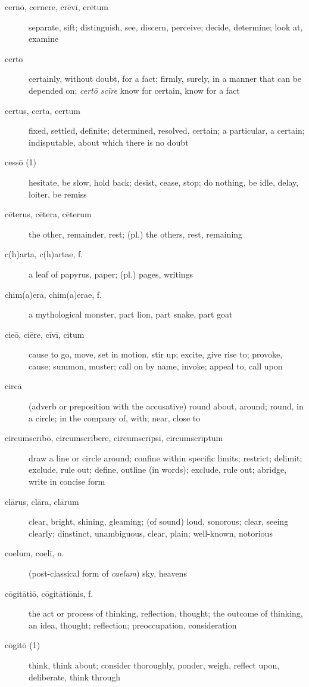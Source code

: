 \begin{description}
    \item[cernō, cernere, crēvī, crētum] \marginnote{*}separate, sift; distinguish, see, discern, perceive; decide, determine; look at, examine
    \item[certō] certainly, without doubt, for a fact; firmly, surely, in a manner that can be depended on; \textit{certō scīre} know for certain, know for a fact
    \item[certus, certa, certum] \marginnote{*}fixed, settled, definite; determined, resolved, certain; a particular, a certain; indisputable, about which there is no doubt
    \item[cessō (1)] hesitate, be slow, hold back; desist, cease, stop; do nothing, be idle, delay, loiter, be remiss
    \item[cēterus, cētera, cēterum] \marginnote{*}the other, remainder, rest; (pl.) the others, rest, remaining
    \item[c(h)arta, c(h)artae, f.]  a leaf of papyrus, paper; (pl.) pages, writings
    \item[chim(a)era, chim(a)erae, f.] a mythological monster, part lion, part snake, part goat
    \item[cieō, ciēre, cīvī, citum] cause to go, move, set in motion, stir up; excite, give rise to; provoke, cause; summon, muster; call on by name, invoke; appeal to, call upon
    \item[circā] \marginnote{*}(adverb or preposition with the accusative) round about, around; round, in a circle; in the company of, with; near, close to
    \item[circumscrībō, circumscrībere, circumscrīpsī, circumscrīptum] draw a line or circle around; confine within specific limits; restrict; delimit; exclude, rule out; define, outline (in words); exclude, rule out; abridge, write in concise form
    \item[clārus, clāra, clārum] \marginnote{*}clear, bright, shining, gleaming; (of sound) loud, sonorous; clear, seeing clearly; dinstinct, unambiguous, clear, plain; well-known, notorious
    \item[coelum, coelī, n.] \marginnote{*}(post-classical form of \textit{caelum}) sky, heavens
    \item[cōgitātiō, cōgitātiōnis, f.] \marginnote{*}the act or process of thinking, reflection, thought; the outcome of thinking, an idea, thought; reflection; preoccupation, consideration
    \item[cōgitō (1)] \marginnote{*}think, think about; consider thoroughly, ponder, weigh, reflect upon, deliberate, think through

\end{description}
